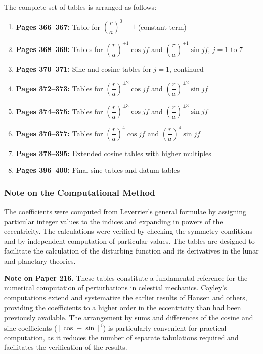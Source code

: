 \documentclass[11pt,a4paper]{book}
\begin{document}
{{The complete set of tables is arranged as follows:

\begin{enumerate}[leftmargin=2em]
  \item \textbf{Pages 366--367:} Table for $\left(\dfrac{r}{a}\right)^{0} = 1$ (constant term)
  \item \textbf{Pages 368--369:} Tables for $\left(\dfrac{r}{a}\right)^{\pm 1}\cos jf$ and $\left(\dfrac{r}{a}\right)^{\pm 1}\sin jf$, $j=1$ to $7$
  \item \textbf{Pages 370--371:} Sine and cosine tables for $j=1$, continued
  \item \textbf{Pages 372--373:} Tables for $\left(\dfrac{r}{a}\right)^{\pm 2}\cos jf$ and $\left(\dfrac{r}{a}\right)^{\pm 2}\sin jf$
  \item \textbf{Pages 374--375:} Tables for $\left(\dfrac{r}{a}\right)^{\pm 3}\cos jf$ and $\left(\dfrac{r}{a}\right)^{\pm 3}\sin jf$
  \item \textbf{Pages 376--377:} Tables for $\left(\dfrac{r}{a}\right)^{4}\cos jf$ and $\left(\dfrac{r}{a}\right)^{4}\sin jf$
  \item \textbf{Pages 378--395:} Extended cosine tables with higher multiples
  \item \textbf{Pages 396--400:} Final sine tables and datum tables
\end{enumerate}

\vspace{1em}

\subsubsection*{Note on the Computational Method}

The coefficients were computed from Leverrier's general formulae by assigning particular integer values to the indices and expanding in powers of the eccentricity. The calculations were verified by checking the symmetry conditions and by independent computation of particular values. The tables are designed to facilitate the calculation of the disturbing function and its derivatives in the lunar and planetary theories.

\vspace{1em}

\noindent\textbf{Note on Paper 216.} These tables constitute a fundamental reference for the numerical computation of perturbations in celestial mechanics. Cayley's computations extend and systematize the earlier results of Hansen and others, providing the coefficients to a higher order in the eccentricity than had been previously available. The arrangement by sums and differences of the cosine and sine coefficients ($[\cos+\sin]^{i}$) is particularly convenient for practical computation, as it reduces the number of separate tabulations required and facilitates the verification of the results.

}}
\end{document}
